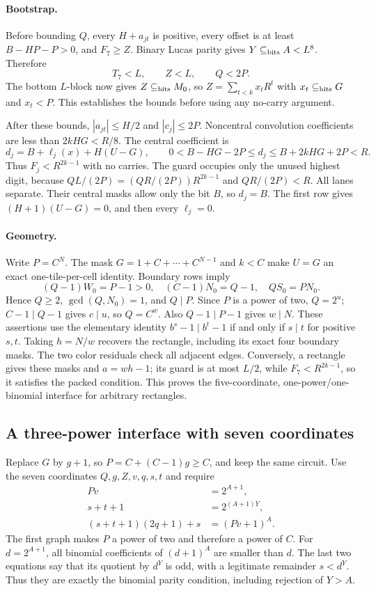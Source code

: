 \paragraph{Bootstrap.}
Before bounding $Q$, every $H+a_{jt}$ is positive, every offset is at
least $B-HP-P>0$, and $F_7\geq Z$. Binary Lucas parity gives
$Y\subseteq_{\rm bits}A<L^8$. Therefore
\[
 T_7<L,\qquad Z<L,\qquad Q<2P.
\]
The bottom $L$-block now gives $Z\subseteq_{\rm bits}M_0$, so
$Z=\sum_{t<k}x_tR^t$ with $x_t\subseteq_{\rm bits}G$ and $x_t<P$.
This establishes the bounds before using any no-carry argument.

After these bounds, $|a_{jt}|\leq H/2$ and $|c_j|\leq2P$.
Noncentral convolution coefficients are less than $2kHG<R/8$.
The central coefficient is
\[
 d_j=B+\ell_j(x)+H(U-G),\qquad
 0<B-HG-2P\leq d_j\leq B+2kHG+2P<R.
\]
Thus $F_j<R^{2k-1}$ with no carries. The guard occupies only the unused
highest digit, because
$QL/(2P)=(QR/(2P))R^{2k-1}$ and $QR/(2P)<R$.
All lanes separate. Their central masks allow only the bit $B$, so
$d_j=B$. The first row gives $(H+1)(U-G)=0$, and then every $\ell_j=0$.

\paragraph{Geometry.}
Write $P=C^N$. The mask $G=1+C+\cdots+C^{N-1}$ and $k<C$ make
$U=G$ an exact one-tile-per-cell identity. Boundary rows imply
\[
 (Q-1)W_0=P-1>0,\quad (C-1)N_0=Q-1,\quad QS_0=PN_0.
\]
Hence $Q\geq2$, $\gcd(Q,N_0)=1$, and $Q\mid P$. Since $P$ is a
power of two, $Q=2^u$; $C-1\mid Q-1$ gives $c\mid u$, so $Q=C^w$.
Also $Q-1\mid P-1$ gives $w\mid N$. These assertions use the elementary
identity $b^s-1\mid b^t-1$ if and only if $s\mid t$ for positive $s,t$.
Taking $h=N/w$ recovers the rectangle, including its exact four boundary
masks. The two color residuals check all adjacent edges. Conversely, a
rectangle gives these masks and $a=wh-1$; its guard is at most $L/2$,
while $F_7<R^{2k-1}$, so it satisfies the packed condition.
This proves the five-coordinate, one-power/one-binomial interface for
arbitrary rectangles.

\subsection{A three-power interface with seven coordinates}
Replace $G$ by $g+1$, so $P=C+(C-1)g\geq C$, and keep the same circuit.
Use the seven coordinates $Q,g,Z,v,q,s,t$ and require
\[
\begin{aligned}
 Pv&=2^{A+1},\\
 s+t+1&=2^{(A+1)Y},\\
 (s+t+1)(2q+1)+s&=(Pv+1)^A.
\end{aligned}
\tag{T3}
\]
The first graph makes $P$ a power of two and therefore a power of $C$.
For $d=2^{A+1}$, all binomial coefficients of $(d+1)^A$ are smaller
than $d$. The last two equations say that its quotient by $d^Y$ is odd,
with a legitimate remainder $s<d^Y$. Thus they are exactly the binomial
parity condition, including rejection of $Y>A$.

